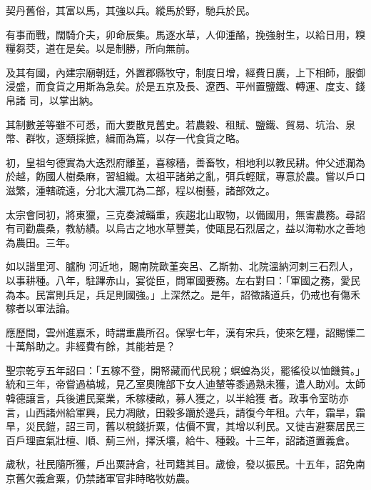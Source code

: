 
\begin{pinyinscope}

 契丹舊俗，其富以馬，其強以兵。縱馬於野，馳兵於民。



 有事而戰，闊騎介夫，卯命辰集。馬逐水草，人仰湩酪，挽強射生，以給日用，糗糧芻茭，道在是矣。以是制勝，所向無前。



 及其有國，內建宗廟朝廷，外置郡縣牧守，制度日增，經費日廣，上下相師，服御浸盛，而食貨之用斯為急矣。於是五京及長、遼西、平州置鹽鐵、轉運、度支、錢帛諸
 司，以掌出納。



 其制數差等雖不可悉，而大要散見舊史。若農穀、租賦、鹽鐵、貿易、坑治、泉幣、群牧，逐類採摭，緝而為篇，以存一代食貨之略。



 初，皇祖勻德實為大迭烈府離堇，喜稼穡，善畜牧，相地利以教民耕。仲父述瀾為於越，飭國人樹桑麻，習組織。太祖平諸弟之亂，弭兵輕賦，專意於農。嘗以戶口滋繁，湩轄疏遠，分北大濃兀為二部，程以樹藝，諸部效之。



 太宗會同初，將東獵，三克奏減輜重，疾趨北山取物，以備國用，無害農務。尋詔有司勸農桑，教紡績。以烏古之地水草豐美，使甌昆石烈居之，益以海勒水之善地為農田。三年。



 如以諧里河、臚朐
 河近地，賜南院歐堇突呂、乙斯勃、北院溫納河剌三石烈人，以事耕種。八年，駐蹕赤山，宴從臣，問軍國要務。左右對曰：「軍國之務，愛民為本。民富則兵足，兵足則國強。」上深然之。是年，詔徵諸道兵，仍戒也有傷禾稼者以軍法論。



 應歷間，雲州進嘉禾，時謂重農所召。保寧七年，漢有宋兵，使來乞糧，詔賜慄二十萬斛助之。非經費有餘，其能若是？



 聖宗乾亨五年詔曰：「五稼不登，開帑藏而代民稅；螟蝗為災，罷徭役以恤饑貧。」統和三年，帝嘗過槁城，見乙室奧隗部下女人迪輦等黍過熟未獲，遣人助刈。太師韓德讓言，兵後逋民棄業，禾稼棲畝，募人獲之，以半給獲
 者。政事令室昉亦言，山西諸州給軍興，民力凋敝，田穀多躪於邊兵，請復今年租。六年，霜旱，霜旱，災民鎧，詔三司，舊以稅錢折粟，估價不實，其增以利民。又徙吉避寨居民三百戶理直氣壯檀、順、薊三州，擇沃壤，給牛、種穀。十三年，詔諸道置義倉。



 歲秋，社民隨所獲，戶出粟詩倉，社司籍其目。歲儉，發以振民。十五年，詔免南京舊欠義倉粟，仍禁諸軍官非時略牧妨農。




\end{pinyinscope}
